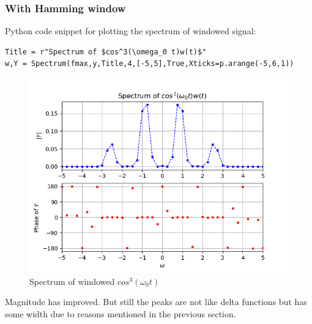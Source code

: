 \documentclass[11pt, a4paper]{article}
\begin{document}
        \subsubsection{With Hamming window}
        Python code snippet for plotting the spectrum of windowed signal:
            \begin{verbatim}
Title = r"Spectrum of $cos^3(\omega_0 t)w(t)$"
w,Y = Spectrum(fmax,y,Title,4,[-5,5],True,Xticks=p.arange(-5,6,1))
            \end{verbatim}
            \begin{figure}[!h]
                \centering
                \includegraphics[scale = 0.65]{Figure 4.png}
                \caption{Spectrum of windowed $cos^3(\omega_0 t)$}
                \label{fig:Figure 4}
            \end{figure}
        Magnitude has improved. But still the peaks are not like delta functions but has some width due to reasons mentioned in the previous section.
    
\end{document}
